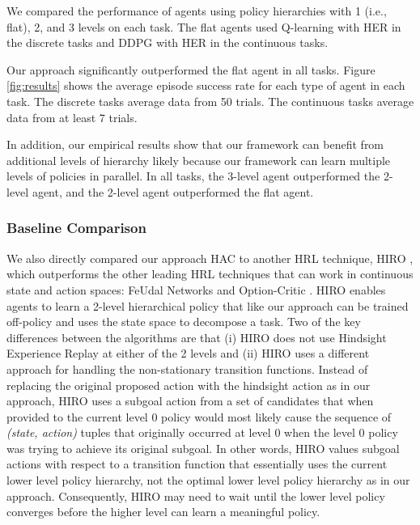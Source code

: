 \documentclass{article} %
\begin{document}
We compared the performance of agents using policy hierarchies with 1 (i.e., flat), 2, and 3 levels on each task.  The flat agents used Q-learning \citep{Watkins92q-learning} with HER in the discrete tasks and DDPG \citep{LillicrapHPHETS15} with HER in the continuous tasks.    

Our approach significantly outperformed the flat agent in all tasks.  Figure \ref{fig:results} shows the average episode success rate for each type of agent in each task.  The discrete tasks average data from 50 trials.  The continuous tasks average data from at least 7 trials. 

In addition, our empirical results show that our framework can benefit from additional levels of hierarchy likely because our framework can learn multiple levels of policies in parallel.  In all tasks, the 3-level agent outperformed the 2-level agent, and the 2-level agent outperformed the flat agent.

\subsubsection{Baseline Comparison}

We also directly compared our approach HAC to another HRL technique, HIRO \citep{DBLP:journals/corr/abs-1805-08296}, which outperforms the other leading HRL techniques that can work in continuous state and action spaces: FeUdal Networks \citep{DBLP:journals/corr/VezhnevetsOSHJS17} and Option-Critic \citep{DBLP:journals/corr/BaconHP16}.  HIRO enables agents to learn a 2-level hierarchical policy that like our approach can be trained off-policy and uses the state space to decompose a task.  Two of the key differences between the algorithms are that (i) HIRO does not use Hindsight Experience Replay at either of the 2 levels and (ii) HIRO uses a different approach for handling the non-stationary transition functions.  Instead of replacing the original proposed action with the hindsight action as in our approach, HIRO uses a subgoal action from a set of candidates that when provided to the current level 0 policy would most likely cause the sequence of \textit{(state, action)} tuples that originally occurred at level 0 when the level 0 policy was trying to achieve its original subgoal.  In other words, HIRO values subgoal actions with respect to a transition function that essentially uses the current lower level policy hierarchy, not the optimal lower level policy hierarchy as in our approach.  Consequently, HIRO may need to wait until the lower level policy converges before the higher level can learn a meaningful policy. 
\end{document}
